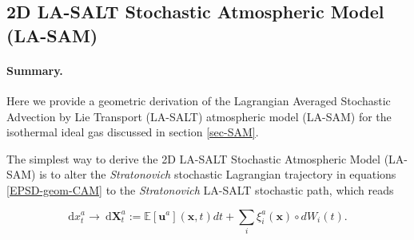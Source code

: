\documentclass[11pt, oneside]{article}   	%
\numberwithin{equation}{section}
\theoremstyle{plain}
\theoremstyle{definition}
\theoremstyle{remark}
\newcommand{\<}{\langle}
\renewcommand{\>}{\rangle}
\def\rmd{{\mathrm{d}}}
\newcommand{\bs}[1]{\boldsymbol{#1}}
\begin{document}
\subsection{2D LA-SALT Stochastic Atmospheric Model (LA-SAM) }\label{app-LASALT}

\paragraph{Summary.}
Here we provide a geometric derivation of the Lagrangian Averaged Stochastic Advection by Lie Transport (LA-SALT) atmospheric model (LA-SAM) for the isothermal ideal gas discussed in section \ref{sec-SAM}. \\  

The simplest way to derive the 2D LA-SALT Stochastic Atmospheric Model (LA-SAM) is to alter the \emph{Stratonovich} stochastic Lagrangian trajectory in equations \eqref{EPSD-geom-CAM} to the \emph{Stratonovich} LA-SALT stochastic path, which reads
 
\begin{equation}
\rmd x_{t}^{a}\rightarrow \ {{\rmd}\mathbf{X}_{t}^{a}} 
:= {\mathbb{E}[\mathbf{u}^{a}]}(\bs{x},t)dt + \sum_{i}\xi _{i}^{a}(\bs{x})\circ dW_{i}(t).
\label{LA-SALTpath}
\end{equation}
\end{document}

